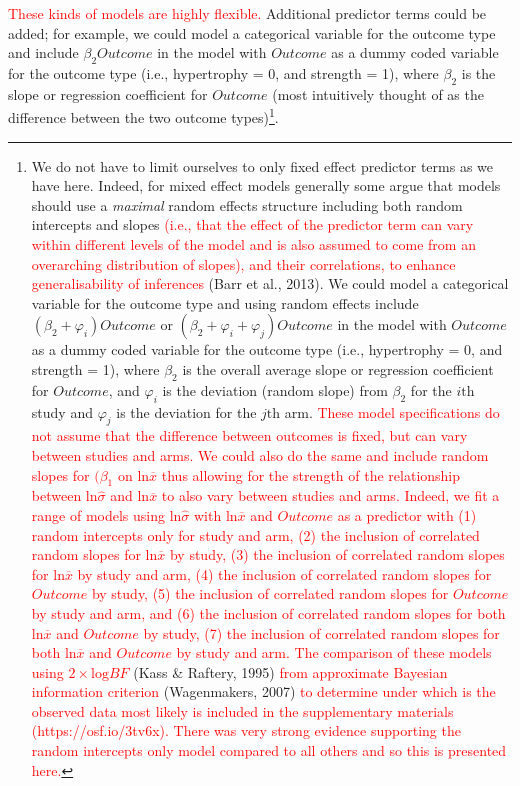 \documentclass[
]{article}
\begin{document}
\textcolor{red}{These kinds of models are highly flexible.} Additional predictor terms could be added; for example, we could model a categorical variable for the outcome type and include \(\beta_{2}Outcome\) in the model with \(Outcome\) as a dummy coded variable for the outcome type (i.e., hypertrophy = 0, and strength = 1), where \(\beta_{2}\) is the slope or regression coefficient for \(Outcome\) (most intuitively thought of as the difference between the two outcome types)\footnote{We do not have to limit ourselves to only fixed effect predictor terms as we have here. Indeed, for mixed effect models generally some argue that models should use a \emph{maximal} random effects structure including both random intercepts and slopes \textcolor{red}{(i.e., that the effect of the predictor term can vary within different levels of the model and is also assumed to come from an overarching distribution of slopes), and their correlations, to enhance generalisability of inferences} (Barr et al., 2013). We could model a categorical variable for the outcome type and using random effects include \((\beta_{2} + \varphi_{i})Outcome\) or \((\beta_{2} + \varphi_{i} + \varphi_{j})Outcome\) in the model with \(Outcome\) as a dummy coded variable for the outcome type (i.e., hypertrophy = 0, and strength = 1), where \(\beta_{2}\) is the overall average slope or regression coefficient for \(Outcome\), and \(\varphi_{i}\) is the deviation (random slope) from \(\beta_{2}\) for the \(i\textrm{th}\) study and \(\varphi_{j}\) is the deviation for the \(j\textrm{th}\) arm. \textcolor{red}{These model specifications do not assume that the difference between outcomes is fixed, but can vary between studies and arms. We could also do the same and include random slopes for $(\beta_{1}$ on $\textrm{ln}\overline{x}$ thus allowing for the strength of the relationship between $\textrm{ln}\hat\sigma$ and $\textrm{ln}\overline{x}$ to also vary between studies and arms. Indeed, we fit a range of models  using $\textrm{ln}\hat\sigma$ with $\textrm{ln}\overline{x}$ and $Outcome$ as a predictor with (1) random intercepts only for study and arm, (2) the inclusion of correlated random slopes for $\textrm{ln}\overline{x}$ by study, (3) the inclusion of correlated random slopes for $\textrm{ln}\overline{x}$ by study and arm, (4) the inclusion of correlated random slopes for $Outcome$ by study, (5) the inclusion of correlated random slopes for $Outcome$ by study and arm, and (6) the inclusion of correlated random slopes for both $\textrm{ln}\overline{x}$ and $Outcome$ by study, (7) the inclusion of correlated random slopes for both $\textrm{ln}\overline{x}$ and $Outcome$ by study and arm.  The comparison of these models using $2\times\textrm{log}BF$} (Kass \& Raftery, 1995) \textcolor{red}{from approximate Bayesian information criterion} (Wagenmakers, 2007) \textcolor{red}{to determine under which is the observed data most likely is included in the supplementary materials (https://osf.io/3tv6x). There was very strong evidence supporting the random intercepts only model compared to all others and so this is presented here.}}.
\end{document}
